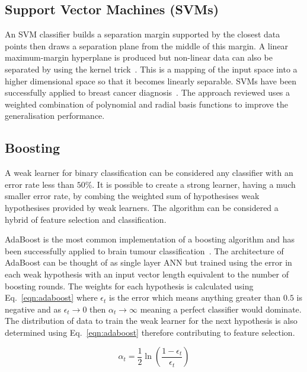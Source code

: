 \documentclass[journal]{IEEEtran}
\begin{document}
\subsection{Support Vector Machines (SVMs)}
An SVM classifier builds a separation margin supported by the closest data points then draws a separation plane from the middle of this margin.
A linear maximum-margin hyperplane is produced but non-linear data can also be separated by using the kernel trick~\cite{cortes95support}. 
This is a mapping of the input space into a higher dimensional space so that it becomes linearly separable.
SVMs have been successfully applied to breast cancer diagnosis~\cite{xiufeng13svm}.
The approach reviewed uses a weighted combination of polynomial and radial basis functions to improve the generalisation performance.



\subsection{Boosting}
A weak learner for binary classification can be considered any classifier with an error rate less than $50$\%.
It is possible to create a strong learner, having a much smaller error rate, by combing the weighted sum of hypothesises weak hypothesises provided by weak learners. 
The algorithm can be considered a hybrid of feature selection and classification.

AdaBoost is the most common implementation of a boosting algorithm and has been successfully applied to brain tumour classification~\cite{freund99boost,islam13multi}.
The architecture of AdaBoost can be thought of as single layer ANN but trained using the error in each weak hypothesis with an input vector length equivalent to the number of boosting rounds.
The weights for each hypothesis is calculated using Eq.~\eqref{eqn:adaboost} where $\epsilon_t$ is the error which means anything greater than $0.5$ is negative and as $\epsilon_t \to 0$ then $\alpha_t \to \infty$ meaning a perfect classifier would dominate.
The distribution of data to train the weak learner for the next hypothesis is also determined using Eq.~\eqref{eqn:adaboost} therefore contributing to feature selection.


\begin{equation}
	\alpha_t = \frac{1}{2}\ln\left(\frac{1 - \epsilon_t}{\epsilon_t}\right)
	\label{eqn:adaboost}
\end{equation}
\end{document}
